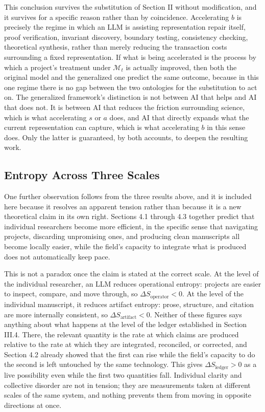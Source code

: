 \documentclass[11pt]{article}
\begin{document}
This conclusion survives the substitution of Section II without modification, and it survives for a specific reason rather than by coincidence. Accelerating $b$ is precisely the regime in which an LLM is assisting representation repair itself, proof verification, invariant discovery, boundary testing, consistency checking, theoretical synthesis, rather than merely reducing the transaction costs surrounding a fixed representation. If what is being accelerated is the process by which a project's treatment under $\mathcal{M}_t$ is actually improved, then both the original model and the generalized one predict the same outcome, because in this one regime there is no gap between the two ontologies for the substitution to act on. The generalized framework's distinction is not between AI that helps and AI that does not. It is between AI that reduces the friction surrounding science, which is what accelerating $s$ or $a$ does, and AI that directly expands what the current representation can capture, which is what accelerating $b$ in this sense does. Only the latter is guaranteed, by both accounts, to deepen the resulting work.

\subsection{Entropy Across Three Scales}

One further observation follows from the three results above, and it is included here because it resolves an apparent tension rather than because it is a new theoretical claim in its own right. Sections 4.1 through 4.3 together predict that individual researchers become more efficient, in the specific sense that navigating projects, discarding unpromising ones, and producing clean manuscripts all become locally easier, while the field's capacity to integrate what is produced does not automatically keep pace.

This is not a paradox once the claim is stated at the correct scale. At the level of the individual researcher, an LLM reduces operational entropy: projects are easier to inspect, compare, and move through, so $\Delta S_{\text{operator}} < 0$. At the level of the individual manuscript, it reduces artifact entropy: prose, structure, and citation are more internally consistent, so $\Delta S_{\text{artifact}} < 0$. Neither of these figures says anything about what happens at the level of the ledger established in Section III.4. There, the relevant quantity is the rate at which claims are produced relative to the rate at which they are integrated, reconciled, or corrected, and Section 4.2 already showed that the first can rise while the field's capacity to do the second is left untouched by the same technology. This gives $\Delta S_{\text{ledger}} > 0$ as a live possibility even while the first two quantities fall. Individual clarity and collective disorder are not in tension; they are measurements taken at different scales of the same system, and nothing prevents them from moving in opposite directions at once.
\end{document}
